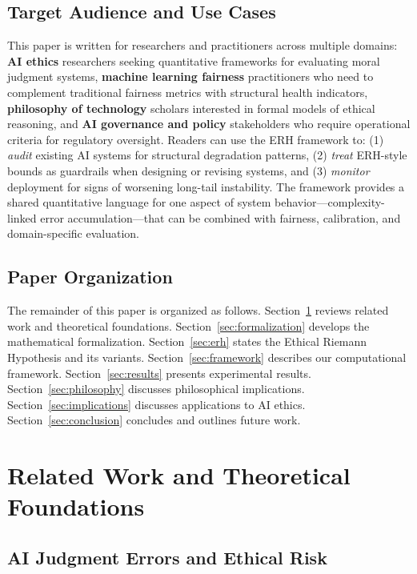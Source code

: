 \documentclass[12pt,a4paper]{article}
\theoremstyle{definition}
\theoremstyle{remark}
\begin{document}
\subsection{Target Audience and Use Cases}

This paper is written for researchers and practitioners across multiple domains: \textbf{AI ethics} researchers seeking quantitative frameworks for evaluating moral judgment systems, \textbf{machine learning fairness} practitioners who need to complement traditional fairness metrics with structural health indicators, \textbf{philosophy of technology} scholars interested in formal models of ethical reasoning, and \textbf{AI governance and policy} stakeholders who require operational criteria for regulatory oversight. Readers can use the ERH framework to: (1) \emph{audit} existing AI systems for structural degradation patterns, (2) \emph{treat} ERH-style bounds as guardrails when designing or revising systems, and (3) \emph{monitor} deployment for signs of worsening long-tail instability. The framework provides a shared quantitative language for one aspect of system behavior---complexity-linked error accumulation---that can be combined with fairness, calibration, and domain-specific evaluation.

\subsection{Paper Organization}

The remainder of this paper is organized as follows. Section~\ref{sec:related} reviews related work and theoretical foundations. Section~\ref{sec:formalization} develops the mathematical formalization. Section~\ref{sec:erh} states the Ethical Riemann Hypothesis and its variants. Section~\ref{sec:framework} describes our computational framework. Section~\ref{sec:results} presents experimental results. Section~\ref{sec:philosophy} discusses philosophical implications. Section~\ref{sec:implications} discusses applications to AI ethics. Section~\ref{sec:conclusion} concludes and outlines future work.

\section{Related Work and Theoretical Foundations}
\label{sec:related}

\subsection{AI Judgment Errors and Ethical Risk}
\end{document}
